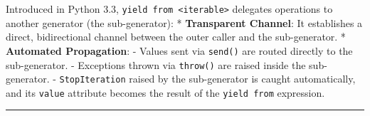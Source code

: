 Introduced in Python 3.3,
\passthrough{\lstinline!yield from <iterable>!} delegates operations to
another generator (the sub-generator): * \textbf{Transparent Channel}:
It establishes a direct, bidirectional channel between the outer caller
and the sub-generator. * \textbf{Automated Propagation}: - Values sent
via \passthrough{\lstinline!send()!} are routed directly to the
sub-generator. - Exceptions thrown via \passthrough{\lstinline!throw()!}
are raised inside the sub-generator. -
\passthrough{\lstinline!StopIteration!} raised by the sub-generator is
caught automatically, and its \passthrough{\lstinline!value!} attribute
becomes the result of the \passthrough{\lstinline!yield from!}
expression.

\begin{center}\rule{0.5\linewidth}{0.5pt}\end{center}
